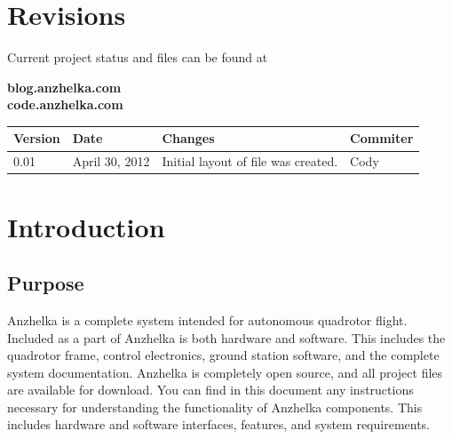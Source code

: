 \documentclass[english]{article}
\numberwithin{equation}{section} %
\begin{document}

\renewcommand{\contentsname}{Table of Contents}
\tableofcontents


\section*{Revisions}
Current project status and files can be found at
\begin{center}
 \textbf{blog.anzhelka.com} \\
 \textbf{code.anzhelka.com} \\
\end{center}

\begin{longtable}{l | l | p{5cm} | l}
\hline
\textbf{Version} & \textbf{Date} & \textbf{Changes} & \textbf{Commiter}\\
\hline
0.01	& April 30, 2012 & Initial layout of file was created. 	& Cody \\
\hline
\end{longtable}



\newpage
{}




\section{Introduction}
\subsection{Purpose}
Anzhelka is a complete system intended for autonomous quadrotor flight. Included as a part of Anzhelka is both hardware and software. This includes the quadrotor frame, control electronics, ground station software, and the complete system documentation. Anzhelka is completely open source, and all project files are available for download. You can find in this document any instructions necessary for understanding the functionality of Anzhelka components. This includes hardware and software interfaces, features, and system requirements.
\end{document}
